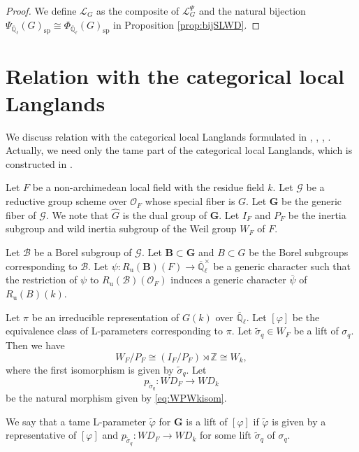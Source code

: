 \documentclass[12pt,a4paper]{article}
\newcommand{\mb}{\mathbb}
\newcommand{\mc}{\mathcal}
\newcommand{\mr}{\mathrm}
\newcommand{\mbf}{\mathbf}
\newcommand{\ol}{\overline}
\newcommand{\wh}{\widehat}
\begin{document}
\begin{proof}
We define $\mc{L}_G$ 
as the composite of $\mc{L}_G^{\Psi}$ 
and 
the natural bijection 
$\Psi_{\ol{\mb{Q}}_{\ell}}(G)_{\mr{sp}} \cong 
\Phi_{\ol{\mb{Q}}_{\ell}}(G)_{\mr{sp}}$ in Proposition \ref{prop:bijSLWD}. 
\end{proof}



\section{Relation with the categorical local Langlands}\label{sec:RelcatLL}

We discuss relation with the categorical local Langlands formulated in 
\cite{BCHNCohSpr}, 
\cite{FaScGeomLLC}, \cite{HelderIH}, \cite{ZhuCohLp}. 
Actually, we need only the tame part of the categorical local Langlands, which is constructed in \cite{ZhuTamecatLLC}. 

Let $F$ be a non-archimedean local field with the residue field $k$. 
Let $\mc{G}$ be a reductive group scheme over $\mc{O}_F$ 
whose special fiber is $G$. 
Let $\mbf{G}$ be the generic fiber of $\mc{G}$. 
We note that $\wh{G}$ is the dual group of $\mbf{G}$. 
Let $I_F$ and $P_F$ be the inertia subgroup and wild inertia subgroup of the Weil group $W_F$ of $F$. 

Let $\mc{B}$ be a Borel subgroup of $\mc{G}$. 
Let $\mbf{B} \subset \mbf{G}$ and $B \subset G$ be the Borel subgroups corresponding to $\mc{B}$. 
Let $\psi \colon R_{\mr{u}}(\mbf{B})(F) \to \ol{\mb{Q}}_{\ell}^{\times}$ be a generic character such that 
the restriction of $\psi$ to $R_{\mr{u}}(\mc{B})(\mc{O}_F)$ induces a generic character $\ol{\psi}$ of $R_{\mr{u}}(B)(k)$. 

Let $\pi$ be an irreducible representation of $G(k)$ over $\ol{\mb{Q}}_{\ell}$. 
Let $[\varphi]$ be the equivalence class of L-parameters corresponding to $\pi$. 
Let $\widetilde{\sigma}_q \in W_F$ be a lift of $\sigma_q$. 
Then we have   
\begin{equation}\label{eq:WPWkisom}
W_F/P_F \cong (I_F/P_F) \rtimes \mb{Z} \cong W_k, 
\end{equation}
where the first isomorphism is given by $\widetilde{\sigma}_q$. 
Let 
\begin{equation*}
p_{\widetilde{\sigma}_q} \colon \mathit{WD}_F \to \mathit{WD}_k
\end{equation*}
be the natural morphism given by \eqref{eq:WPWkisom}. 

We say that a tame L-parameter $\widetilde{\varphi}$ for $\mbf{G}$ is a lift of $[\varphi]$ if 
$\widetilde{\varphi}$ is given by 
a representative of $[\varphi]$ and $p_{\widetilde{\sigma}_q} \colon \mathit{WD}_F \to \mathit{WD}_k$ for some lift $\widetilde{\sigma}_q$ of $\sigma_q$. 
\end{document}
